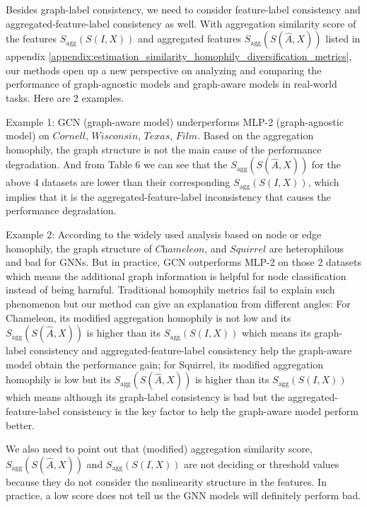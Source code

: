 \documentclass{article}
\newcommand{\0}{{\boldsymbol{0}}}
\newcommand{\6}{{\partial}}
\newcommand{\8}{{\infty}}
\newcommand{\4}{{\nabla}}
\begin{document}
Besides graph-label consistency, we need to consider feature-label consistency and aggregated-feature-label consistency as well. With aggregation similarity score of the features $S_\text{agg}\left(S(I,X)\right)$ and aggregated features $S_\text{agg}\left(S(\hat{A},X)\right)$ listed in appendix \ref{appendix:estimation_similarity_homophily_diversification_metrics}, our methods open up a new perspective on analyzing and comparing the performance of graph-agnostic models and graph-aware models in real-world tasks. Here are 2 examples.

Example 1: GCN (graph-aware model) underperforms MLP-2 (graph-agnostic model) on $\textit{Cornell, Wisconsin, Texas, Film}$. Based on the aggregation homophily, the graph structure is not the main cause of the performance degradation. And from Table 6 we can see that the $S_\text{agg}\left(S(\hat{A},X)\right)$ for the above 4 datasets are lower than their corresponding $S_\text{agg}\left(S(I,X)\right)$, which implies that it is the aggregated-feature-label inconsistency that causes the performance degradation.

Example 2: According to the widely used analysis based on node or edge homophily, the graph structure of $\textit{Chameleon}$, and $\textit{Squirrel}$ are heterophilous and bad for GNNs. But in practice, GCN outperforms MLP-2 on those 2 datasets which means the additional graph information is helpful for node classification instead of being harmful. Traditional homophily metrics fail to explain such phenomenon but our method can give an explanation from different angles: For Chameleon, its modified aggregation homophily is not low and its $S_\text{agg}\left(S(\hat{A},X)\right)$ is higher than its $S_\text{agg}\left(S(I,X)\right)$ which means its graph-label consistency and aggregated-feature-label consistency help the graph-aware model obtain the performance gain; for Squirrel, its modified aggregation homophily is low but its $S_\text{agg}\left(S(\hat{A},X)\right)$ is higher than its $S_\text{agg}\left(S(I,X)\right)$ which means although its graph-label consistency is bad but the aggregated-feature-label consistency is the key factor to help the graph-aware model perform better.

We also need to point out that (modified) aggregation similarity score, $S_\text{agg}\left(S(\hat{A},X)\right)$ and $S_\text{agg}\left(S(I,X)\right)$ are not deciding or threshold values because they do not consider the nonlinearity structure in the features. In practice, a low score does not tell us the GNN models will definitely perform bad.
\end{document}
